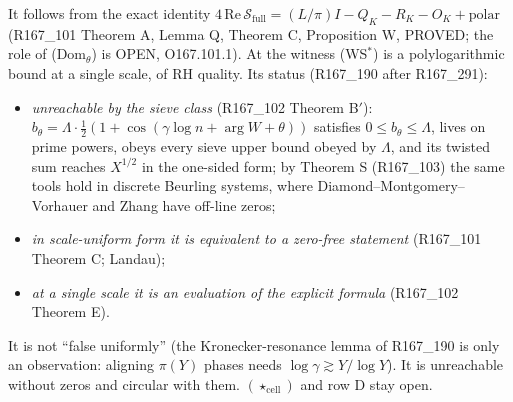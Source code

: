\documentclass[11pt]{amsart}
\theoremstyle{definition}
\theoremstyle{remark}
\begin{document}
\noindent It follows from the exact identity $4\,\mathrm{Re}\,\mathcal S_{\mathrm{full}}=(L/\pi)I-Q_K-R_K-O_K+\text{polar}$ (R167\_101 Theorem A,
Lemma Q, Theorem C, Proposition W, PROVED; the role of (Dom$_\theta$) is OPEN, O167.101.1). At the witness (WS$^*$) is a polylogarithmic bound at a
single scale, of RH quality. Its status (R167\_190 after R167\_291):
\begin{itemize}
\item \emph{unreachable by the sieve class} (R167\_102 Theorem B$'$): $b_\theta=\Lambda\cdot\frac12(1+\cos(\gamma\log n+\arg W+\theta))$ satisfies
$0\le b_\theta\le\Lambda$, lives on prime powers, obeys every sieve upper bound obeyed by $\Lambda$, and its twisted sum reaches $X^{1/2}$ in the
one-sided form; by Theorem S (R167\_103) the same tools hold in discrete Beurling systems, where Diamond--Montgomery--Vorhauer and Zhang have
off-line zeros;
\item \emph{in scale-uniform form it is equivalent to a zero-free statement} (R167\_101 Theorem C; Landau);
\item \emph{at a single scale it is an evaluation of the explicit formula} (R167\_102 Theorem E).
\end{itemize}
It is not ``false uniformly'' (the Kronecker-resonance lemma of R167\_190 is only an observation: aligning $\pi(Y)$ phases needs
$\log\gamma\gtrsim Y/\log Y$). It is unreachable without zeros and circular with them. $(\star_{\mathrm{cell}})$ and row D stay open.
\end{document}

